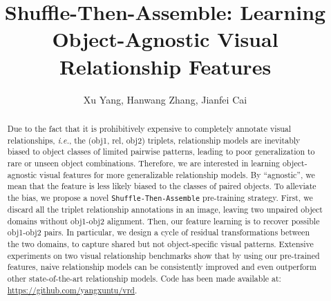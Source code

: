 \documentclass[runningheads]{llncs}
\newcommand{\ie}{\textit{i.e.}}
\begin{document}
\pagestyle{headings}
\mainmatter
\def\ECCV18SubNumber{1372} 

\title{Shuffle-Then-Assemble: Learning Object-Agnostic Visual Relationship Features} 



\author{Xu Yang, Hanwang Zhang, Jianfei Cai}




\maketitle

\begin{abstract}
Due to the fact that it is prohibitively expensive to completely annotate visual relationships, \ie, the (obj1, rel, obj2) triplets, relationship models are inevitably biased to object classes of limited pairwise patterns, leading to poor generalization to rare or unseen object combinations. Therefore, we are interested in learning object-agnostic visual features for more generalizable relationship models. By ``agnostic'', we mean that the feature is less likely biased to the classes of paired objects. To alleviate the bias, we propose a novel \texttt{Shuffle-Then-Assemble} pre-training strategy. First, we discard all the triplet relationship annotations in an image, leaving two unpaired object domains without obj1-obj2 alignment. Then, our feature learning is to recover possible obj1-obj2 pairs. In particular, we design a cycle of residual transformations between the two domains, to capture shared but not object-specific visual patterns. Extensive experiments on two visual relationship benchmarks show that by using our pre-trained features, naive relationship models can be consistently improved and even outperform other state-of-the-art relationship models. 
Code has been made available at: \url{https://github.com/yangxuntu/vrd}.
\end{abstract}
\end{document}
